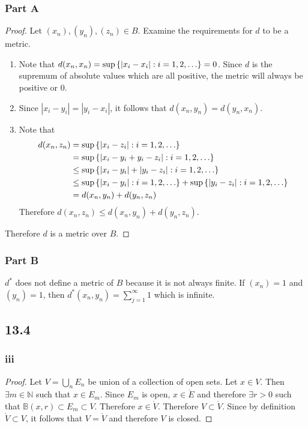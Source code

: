 \documentclass[12pt,titlepage]{extarticle}
\begin{document}
\subsubsection*{Part A}
\begin{proof}
    Let $(x_n),(y_n),(z_n) \in B$. Examine the requirements for $d$ to be a metric.
    \begin{enumerate}
        \item %
            Note that $d(x_n,x_n) = \sup\qty{|x_i - x_i| : i = 1, 2,\ldots} = 0$. Since $d$ is the supremum of absolute values which are all positive, the metric will always be positive or $0$.
        \item %
            Since $|x_i - y_i| = |y_i - x_i|$, it follows that $d(x_n,y_n) = d(y_n, x_n)$.
        \item %
            Note that
            \begin{align*}
                d(x_n,z_n) &= \sup\qty{|x_i - z_i| : i = 1,2,\ldots} \\
                           &= \sup\qty{|x_i - y_i + y_i - z_i| : i = 1,2,\ldots} \\
                           &\leq \sup\qty{|x_i - y_i| + |y_i - z_i| : i = 1,2,\ldots} \\
                           &\leq \sup\qty{|x_i - y_i| : i = 1,2,\ldots} + \sup\qty{|y_i - z_i|: i = 1,2,\ldots} \\
                           &= d(x_n, y_n) + d(y_n, z_n)
            \end{align*}
            Therefore $d(x_n, z_n) \leq d(x_n, y_n) + d(y_n, z_n)$.
    \end{enumerate}
    Therefore $d$ is a metric over $B$.
\end{proof}

\subsubsection*{Part B}
$d^*$ does not define a metric of $B$ because it is not always finite. If $(x_n) = 1$ and $(y_n) = 1$, then $d^*(x_n, y_n) = \sum_{j=1}^\infty 1$ which is infinite.

\subsection*{13.4}
\subsubsection*{iii}
\begin{proof}
    Let $V = \bigcup_n E_n$ be union of a collection of open sets. Let $x \in V$. Then $\exists m \in \mathbb{N}$ such that $x \in E_m$. Since $E_m$ is open, $x \in \mathring{E}$ and therefore $\exists r > 0$ such that $\mathbb{B}(x,r) \subset E_m \subset V$. Therefore $x \in \mathring{V}$. Therefore $V \subset \mathring{V}$. Since by definition $\mathring{V} \subset V$, it follows that $V = \mathring{V}$ and therefore $V$ is closed.
\end{proof}
\end{document}
